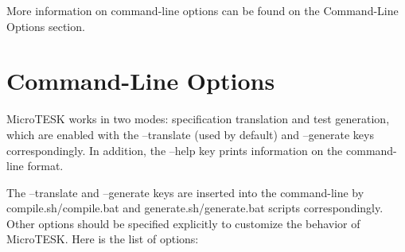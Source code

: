 \documentclass[oneside,final,14pt]{extreport}
\begin{document}
More information on command-line options can be found on the Command-Line Options
section.

\section{Command-Line Options}

MicroTESK works in two modes: specification translation and test generation,
which are enabled with the --translate (used by default) and --generate keys
correspondingly. In addition, the --help key prints information on the command-line format.

The --translate and --generate keys are inserted into the command-line by
compile.sh/compile.bat and generate.sh/generate.bat scripts correspondingly.
Other options should be specified explicitly to customize the behavior of MicroTESK.
Here is the list of options:
\end{document}
